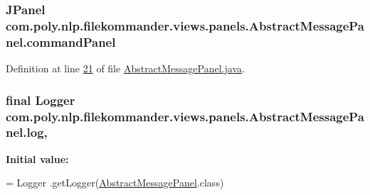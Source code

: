 \hypertarget{classcom_1_1poly_1_1nlp_1_1filekommander_1_1views_1_1panels_1_1_abstract_message_panel_aa43af4d88699d2fe9fe0c52a8b1d250c}{
\subsubsection[{command\-Panel}]{\setlength{\rightskip}{0pt plus 5cm}J\-Panel com.\-poly.\-nlp.\-filekommander.\-views.\-panels.\-Abstract\-Message\-Panel.\-command\-Panel\hspace{0.3cm}{\ttfamily [private]}}}\label{classcom_1_1poly_1_1nlp_1_1filekommander_1_1views_1_1panels_1_1_abstract_message_panel_aa43af4d88699d2fe9fe0c52a8b1d250c}


Definition at line \hyperlink{L21}{21} of file \hyperlink{}{Abstract\-Message\-Panel.\-java}.

\hypertarget{classcom_1_1poly_1_1nlp_1_1filekommander_1_1views_1_1panels_1_1_abstract_message_panel_a8f8836218e523baaab4c65c0bc9b1f7e}{
\subsubsection[{log}]{\setlength{\rightskip}{0pt plus 5cm}final Logger com.\-poly.\-nlp.\-filekommander.\-views.\-panels.\-Abstract\-Message\-Panel.\-log\hspace{0.3cm}{\ttfamily [static]}, {\ttfamily [private]}}}\label{classcom_1_1poly_1_1nlp_1_1filekommander_1_1views_1_1panels_1_1_abstract_message_panel_a8f8836218e523baaab4c65c0bc9b1f7e}
{\bfseries Initial value\-:}
\begin{DoxyCode}
= Logger
            .getLogger(\hyperlink{classcom_1_1poly_1_1nlp_1_1filekommander_1_1views_1_1panels_1_1_abstract_message_panel_a3d34321337c68753d8ca1c3cfb4cb37b}{AbstractMessagePanel}.class)
\end{DoxyCode}


